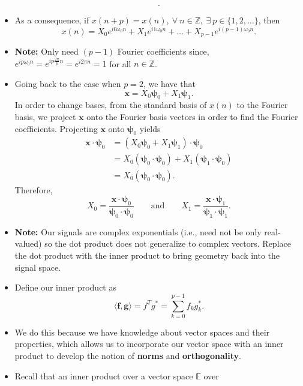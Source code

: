 \begin{itemize}
\[		      .\]
	\item As a consequence, if
	      $x(n+p) = x(n),\ \forall\ n \in \mathbb{Z},\ \exists\ p \in \{1,2,\ldots\}$,
	      then
	      \begin{equation}
		      x(n) = X_0e^{i 0\omega_0 n} + X_1e^{i 1\omega_0 n} + \ldots + X_{p-1}e^{i(p-1)\omega_0 n}
		      .\end{equation}
	\item  \textbf{Note:} Only need $(p-1)$ Fourier coefficients since,
	      $e^{ip\omega_0n} = e^{ip\frac{2\pi}{p}n} = e^{i2\pi n} = 1$ for all $n \in \mathbb{Z}$.
	\item Going back to the case when $p=2$, we have that
	      \[
		      \bm{x} = X_0\bm{\psi}_0 + X_1\bm{\psi}_1
		      .\]
	      In order to change bases, from the standard basis of $x(n)$ to
	      the Fourier basis, we project $\bm{x}$ onto the Fourier basis
	      vectors in order to find the Fourier coefficients.
	      Projecting $\bm{x}$ onto $\bm{\psi}_0$ yields
	      \begin{align*}
		      \bm{x} \cdot \bm{\psi}_0 & = (X_0\bm{\psi}_0 + X_1\bm{\psi}_1) \cdot \bm{\psi}_0                     \\
		                               & = X_0(\bm{\psi}_0 \cdot \bm{\psi}_0) + X_1(\bm{\psi}_1 \cdot \bm{\psi}_0) \\
		                               & = X_0(\bm{\psi}_0 \cdot \bm{\psi}_0)
		      .\end{align*}
	      Therefore,
	      \[
		      X_0 = \frac{\bm{x} \cdot \bm{\psi}_0}{\bm{\psi}_0 \cdot \bm{\psi}_0} \qquad
		      \text{and} \qquad
		      X_1 = \frac{\bm{x} \cdot \bm{\psi}_1}{\bm{\psi}_1 \cdot \bm{\psi}_1}
		      .\]
	\item \textbf{Note:} Our signals are complex exponentials
	      (i.e., need not be only real-valued) so the dot product does not
	      generalize to complex vectors. Replace the dot product with the
	      inner product to bring geometry back into the signal space.
	\item Define our inner product as
	      \[
		      \langle \bm{f}, \bm{g} \rangle = f^Tg^* = \sum_{k=0}^{p-1} f_{k}g^*_{k}
		      .\]
	\item We do this because we have knowledge about vector spaces and
	      their properties, which allows us to incorporate our vector
	      space with an inner product to develop the notion of \textbf{norms}
	      and \textbf{orthogonality}.
	\item Recall that an inner product over a vector space $\mathbb{E}$ over

\end{itemize}
